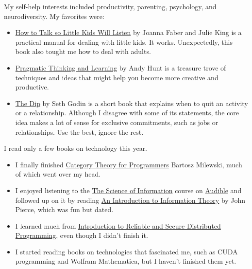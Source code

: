 \documentclass{article}
\begin{document}
My self-help interests included productivity, parenting, psychology, and neurodiversity.
My favorites were:
\begin{itemize}
\item
\href{https://www.goodreads.com/book/show/29430725-how-to-talk-so-little-kids-will-listen}{How to Talk so Little Kids Will Listen} by Joanna Faber and Julie King is a practical manual for dealing with little kids.
It works.
Unexpectedly, this book also tought me how to deal with adults.
\item
\href{https://www.goodreads.com/book/show/3063393-pragmatic-thinking-and-learning}{Pragmatic Thinking and Learning} by Andy Hunt is a treasure trove of techniques and ideas that might help you become more creative and productive.
\item
\href{https://www.goodreads.com/book/show/324748.The_Dip}{The Dip} by Seth Godin is a short book that explains when to quit an activity or a relationship.
Although I disagree with some of its statements, the core idea makes a lot of sense for exclusive commitments, such as jobs or relationships.
Use the best, ignore the rest.
\end{itemize}

I read only a few books on technology this year.
\begin{itemize}
\item
I finally finished \href{https://www.goodreads.com/book/show/33618151-category-theory-for-programmers}{Category Theory for Programmers} Bartosz Milewski, much of which went over my head.
\item
I enjoyed listening to the \href{https://www.thegreatcourses.com/courses/the-science-of-information-from-language-to-black-holes}{The Science of Information} course on \href{https://www.audible.de/pd/The-Science-of-Information-From-Language-to-Black-Holes-Hoerbuch/1629976067}{Audible}
and followed up on it by reading \href{https://www.goodreads.com/book/show/433443.An_Introduction_to_Information_Theory}{An Introduction to Information Theory} by John Pierce, which was fun but dated.
\item
I learned much from \href{https://www.goodreads.com/book/show/10064443-introduction-to-reliable-and-secure-distributed-programming}{Introduction to Reliable and Secure Distributed Programming}, even though I didn't finish it.
\item
I started reading books on technologies that fascinated me, such as CUDA programming and Wolfram Mathematica, but I haven't finished them yet.
\end{itemize}
\end{document}
